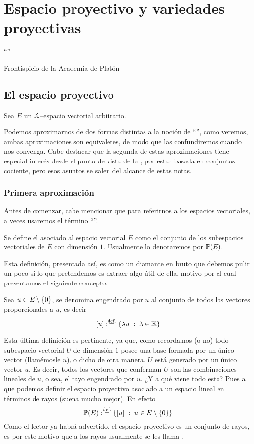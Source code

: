 \chapter{Espacio proyectivo y variedades proyectivas}
\label{epro}
\epigraph{``''}{Frontispicio de la Academia de Platón}
\section{El espacio proyectivo}
Sea $E$ un $\mathbb{K}$--espacio vectorial arbitrario.

Podemos aproximarnos de dos formas distintas a la noción de ``'', como veremos, ambas aproximaciones son equivaletes, de modo que las confundiremos cuando nos convenga. Cabe destacar que la segunda de estas aproximaciones tiene especial interés desde el punto de vista de la , por estar basada en conjuntos cociente, pero esos asuntos se salen del alcance de estas notas.
\subsection{Primera aproximación}
Antes de comenzar, cabe mencionar que para referirnos a los espacios vectoriales, a veces usaremos el término ``''.
\begin{defi}
	\label{epro_def_espacioProyectivo1}
	Se define el  asociado al espacio vectorial $E$ como el conjunto de los subespacios vectoriales de $E$ con dimensión $1$. Usualmente lo denotaremos por $\mathbb{P}(E)$.
\end{defi}
Esta definición, presentada así, es como un diamante en bruto que debemos pulir un poco si lo que pretendemos es extraer algo útil de ella, motivo por el cual presentamos el siguiente concepto.
\begin{defi}[Rayo]
	\label{epro_def_rayo}
	Sea $u\in E\setminus\{0\}$, se denomina  engendrado por $u$ al conjunto de todos los vectores proporcionales a $u$, es decir
	\begin{equation*}
		\left [ u \right ]:\stackrel{\textrm{def.}}{=}\{\lambda u\;:\; \lambda\in\mathbb{K}\}
	\end{equation*} 
\end{defi}
Esta última definición es pertinente, ya que, como recordamos (o no) todo subespacio vectorial $U$ de dimensión $1$ posee una base formada por un único vector (llamémosle $u$), o dicho de otra manera, $U$ está generado por un único vector $u$. Es decir, todos los vectores que conforman $U$ son las combinaciones lineales de $u$, o sea, el rayo engendrado por $u$. ¿Y a qué viene todo esto? Pues a que podemos definir el espacio proyectivo asociado a un espacio lineal en términos de rayos (suena mucho mejor). En efecto
\begin{equation*}
	\mathbb{P}(E):\stackrel{\textrm{def.}}{=}\{\left [ u \right ]\;:\; u\in E\setminus\{0\}\}
\end{equation*}
Como el lector ya habrá advertido, el espacio proyectivo es un conjunto de rayos, es por este motivo que a los rayos usualmente se les llama .

